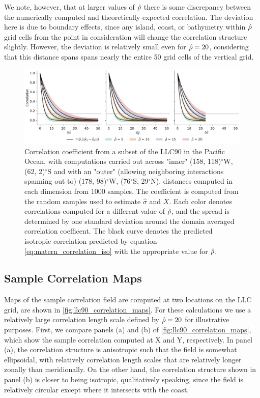 We note, however, that at larger values of $\hat{\rho}$ there is some discrepancy
between the numerically computed and theoretically expected correlation.
The deviation here is due to boundary effects, since any island, coast, or
bathymetry within $\hat{\rho}$ grid cells from the point in consideration will
change the correlation structure slightly.
However, the deviation is relatively small even for $\hat{\rho}=20$, considering
that this distance spans spans nearly the entire 50 grid cells of the vertical
grid.

\begin{figure}
    \centering
    \includegraphics[width=\textwidth]{../figures/matern_llc90_correlation-k25-iy165-ix90-1000samples-4curves.pdf}
    \caption{Correlation coefficient from a subset of the LLC90 in the Pacific
        Ocean, with computations carried out across "inner"
        (158, 118)$^\circ$W,
        (62, 2)$^\circ$S and
        with an "outer" (allowing neighboring interactions spanning out to)
        (178, 98)$^\circ$W,
        (76$^\circ$S, 29$^\circ$N).
        distances computed in each dimension from 1000 samples. The coefficient is
        computed from the random samples used to estimate
        $\hat{\sigma}$ and $X$. Each color denotes correlations computed for a
        different value of $\hat{\rho}$, and the spread is determined by one standard
        deviation around the domain averaged correlation coefficent.
        The black curve denotes the predicted isotropic correlation predicted by
        equation \eqref{eq:matern_correlation_iso} with the appropriate value for
        $\hat{\rho}$.}
    \label{fig:llc90_correlations}
\end{figure}

\subsection{Sample Correlation Maps}
\label{ssec:llc90_correlation_maps}

Maps of the sample correlation field are computed at two locations on the LLC
grid, are shown in
\cref{fig:llc90_correlation_maps}.
For these calculations we use a relatively large correlation length scale
defined by $\hat{\rho}=20$ for illustrative purposes.
First, we compare panels (a) and (b) of \cref{fig:llc90_correlation_maps}, which
show the sample correlation computed at X and Y, respectively.
In panel (a), the correlation structure is anisotropic such that the field is
somewhat ellipsoidal, with relatively correlation length scales that are
relatively longer zonally than meridionally.
On the other hand, the correlation structure shown in panel (b) is closer to
being isotropic, qualitatively speaking, since the field is relatively circular
except where it intersects with the coast.

